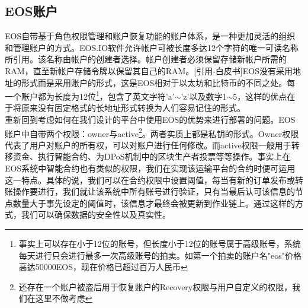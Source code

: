 \documentclass[UTF8]{ctexart}
\begin{document}
\begin{multicols}{2}
  \subsection{EOS账户}
  EOS自带基于角色权限管理和账户恢复功能的账户体系，是一种更加灵活的组织和管理账户的方式。EOS.IO软件允许帐户可被长度多达12个字符的唯一可读名称所引用。该名称由帐户的创建者选择。帐户创建者必须保留存储新帐户所需的RAM，直至新帐户存储令牌以保留其自己的RAM。[引用-白皮书]EOS没有采用地址的形式而是采用账户的形式，这是EOS相对于以太坊和比特币的不同之处。每一个账户都为长度为12位\footnote[1]{事实上可以存在小于12位的账号，但长度小于12位的账号属于高级账号，系统每天进行只会进行最多一次高级账号的拍卖。如第一个拍卖的账户名"eos"价格高达50000EOS，现在价格已超过百万人民币}，包含了英文字符'a'$\sim$'z'以及数字1$\sim$5，这样的优点在于将原来没有固定格式的长地址形式转换为人们容易记住的形式。\\
  \indent 重新回到考虑如何在我们设计的平台中使用EOS的优势来进行部署的问题。EOS账户中自带两个权限：owner与active\footnote[2]{还存在一个账户被盗后用于恢复账户的Recovery权限与用户自定义的权限，我们在这里不做考虑}。两者实质上都是私钥的形式。Owner权限代表了用户对账户的所有权，可以对账户进行任何修改。而active权限一般用于转移资金、执行智能合约、为DPoS机制中的区块生产者投票等等操作。事实上在EOS系统中智能合约也有类似的权限，我们在实现该运输平台的合约时便可运用这一特点。具体的说，我们可以在合约权限中设置阈值，每当有新的订单发布或转账操作要进行，我们就让该系统中所有账号进行验证，只有当最后认可该信息的节点数量大于事先设定的阈值时，该信息才最终会被更新到作业链上。通过这样的方式，我们可以确保数据的安全性以及真实性。\\

\end{multicols}
\end{document}
